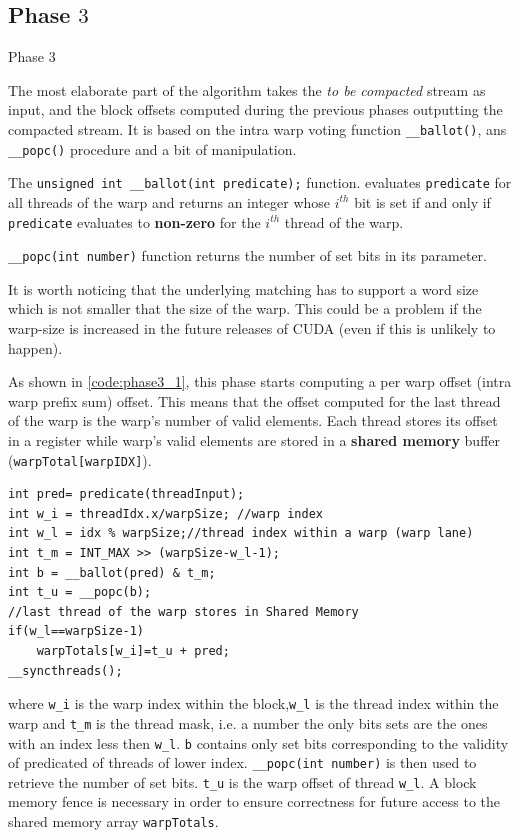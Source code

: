 \subsection{Phase $3$}
Phase 3

The most elaborate part of the algorithm takes the \textit{to be compacted} stream as input, and the block offsets computed during the previous phases outputting the compacted stream.
It is based on the intra warp voting function \texttt{\_\_ballot()}, ans \texttt{\_\_popc()} procedure and a bit of manipulation. 

The \verb|unsigned int __ballot(int predicate);| function.
evaluates \verb|predicate| for all threads of the warp and 
returns an integer whose $i^{th}$ bit is set if and only if \verb|predicate| evaluates to \textbf{non-zero} for the $i^{th}$ thread of the warp.

\verb|__popc(int number)| function returns the number of set bits in its parameter.

It is worth noticing that the underlying matching has to support a word size which is not smaller that the size of the warp. This could be a problem if the warp-size is increased in the future releases of CUDA (even if this is unlikely to happen).

As shown in \ref{code:phase3_1}, this phase starts computing a per warp offset (intra warp prefix sum) offset. This means that the offset computed for the last thread of the warp is the warp's number of valid elements. Each thread  stores its offset in a register while warp's valid elements are stored in a \textbf{shared memory} buffer (\verb|warpTotal[warpIDX]|). 
\begin{lstlisting}
int pred= predicate(threadInput);
int w_i = threadIdx.x/warpSize; //warp index
int w_l = idx % warpSize;//thread index within a warp (warp lane)
int t_m = INT_MAX >> (warpSize-w_l-1);
int b = __ballot(pred) & t_m;
int t_u = __popc(b);
//last thread of the warp stores in Shared Memory
if(w_l==warpSize-1)
	warpTotals[w_i]=t_u + pred;
__syncthreads();
\end{lstlisting}
where \verb|w_i| is the warp index within the block,\verb|w_l| is the thread index within the warp and \verb|t_m| is the thread mask, i.e. a number the only bits sets are the ones with an index less then \verb|w_l|. \verb|b| contains only set bits corresponding to the validity of predicated of threads of lower index. \verb|__popc(int number)| is then used to retrieve the number of set bits. \verb|t_u| is the warp offset of thread \verb|w_l|.
A block memory fence is necessary in order to ensure correctness for future access to the shared memory array \verb|warpTotals|.

